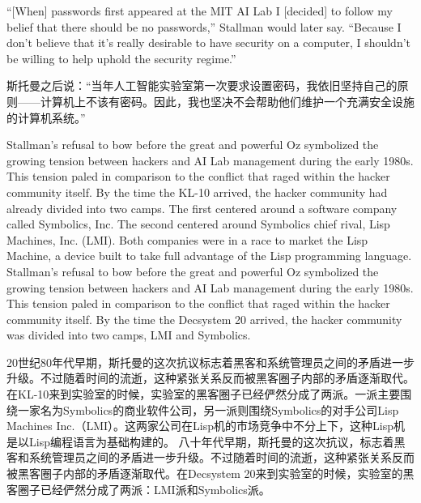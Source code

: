 \ifdefined\eng
``[When] passwords first appeared at the MIT AI Lab I [decided] to follow my belief that there should be no passwords,'' Stallman would later say. ``Because I don't believe that it's really desirable to have security on a computer, I shouldn't be willing to help uphold the security regime.''
\fi

\ifdefined\chs
斯托曼之后说：``当年人工智能实验室第一次要求设置密码，我依旧坚持自己的原则——计算机上不该有密码。因此，我也坚决不会帮助他们维护一个充满安全设施的计算机系统。''
\fi

\ifdefined\eng
\ifdefined\vone
Stallman's refusal to bow before the great and powerful Oz symbolized the growing tension between hackers and AI Lab management during the early 1980s. This tension paled in comparison to the conflict that raged within the hacker community itself. By the time the KL-10 arrived, the hacker community had already divided into two camps. The first centered around a software company called Symbolics, Inc. The second centered around Symbolics chief rival, Lisp Machines, Inc. (LMI). Both companies were in a race to market the Lisp Machine, a device built to take full advantage of the Lisp programming language.
\fi
\ifdefined\vtwo
Stallman's refusal to bow before the great and powerful Oz symbolized the growing tension between hackers and AI Lab management during the early 1980s. This tension paled in comparison to the conflict that raged within the hacker community itself. By the time the Decsystem 20 arrived, the hacker community was divided into two camps, LMI and Symbolics.
\fi
\fi

\ifdefined\chs
\ifdefined\vone
20世纪80年代早期，斯托曼的这次抗议标志着黑客和系统管理员之间的矛盾进一步升级。不过随着时间的流逝，这种紧张关系反而被黑客圈子内部的矛盾逐渐取代。在KL-10来到实验室的时候，实验室的黑客圈子已经俨然分成了两派。一派主要围绕一家名为Symbolics的商业软件公司，另一派则围绕Symbolics的对手公司Lisp Machines Inc.（LMI）。这两家公司在Lisp机的市场竞争中不分上下，这种Lisp机是以Lisp编程语言为基础构建的。
\fi
\ifdefined\vtwo
八十年代早期，斯托曼的这次抗议，标志着黑客和系统管理员之间的矛盾进一步升级。不过随着时间的流逝，这种紧张关系反而被黑客圈子内部的矛盾逐渐取代。在Decsystem 20来到实验室的时候，实验室的黑客圈子已经俨然分成了两派：LMI派和Symbolics派。
\fi
\fi

